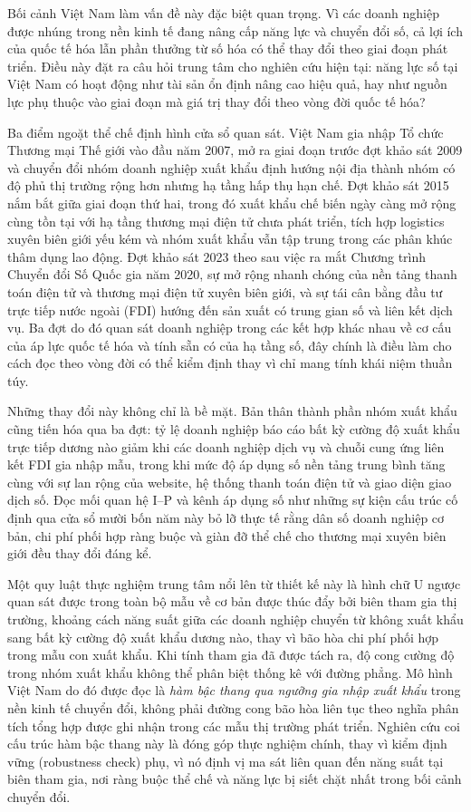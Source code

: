 \documentclass[12pt,a4paper]{article}
\begin{document}
Bối cảnh Việt Nam làm vấn đề này đặc biệt quan trọng. Vì các doanh
nghiệp được nhúng trong nền kinh tế đang nâng cấp năng lực và chuyển đổi
số, cả lợi ích của quốc tế hóa lẫn phần thưởng từ số hóa có thể thay đổi
theo giai đoạn phát triển. Điều này đặt ra câu hỏi trung tâm cho nghiên
cứu hiện tại: năng lực số tại Việt Nam có hoạt động như tài sản ổn định
nâng cao hiệu quả, hay như nguồn lực phụ thuộc vào giai đoạn mà giá trị
thay đổi theo vòng đời quốc tế hóa?

Ba điểm ngoặt thể chế định hình cửa sổ quan sát. Việt Nam gia nhập Tổ
chức Thương mại Thế giới vào đầu năm 2007, mở ra giai đoạn trước đợt
khảo sát 2009 và chuyển đổi nhóm doanh nghiệp xuất khẩu định hướng nội
địa thành nhóm có độ phủ thị trường rộng hơn nhưng hạ tầng hấp thụ hạn
chế. Đợt khảo sát 2015 nắm bắt giữa giai đoạn thứ hai, trong đó xuất
khẩu chế biến ngày càng mở rộng cùng tồn tại với hạ tầng thương mại điện
tử chưa phát triển, tích hợp logistics xuyên biên giới yếu kém và nhóm
xuất khẩu vẫn tập trung trong các phân khúc thâm dụng lao động. Đợt khảo
sát 2023 theo sau việc ra mắt Chương trình Chuyển đổi Số Quốc gia năm
2020, sự mở rộng nhanh chóng của nền tảng thanh toán điện tử và thương
mại điện tử xuyên biên giới, và sự tái cân bằng đầu tư trực tiếp nước
ngoài (FDI) hướng đến sản xuất có trung gian số và liên kết dịch vụ. Ba
đợt do đó quan sát doanh nghiệp trong các kết hợp khác nhau về cơ cấu
của áp lực quốc tế hóa và tính sẵn có của hạ tầng số, đây chính là điều
làm cho cách đọc theo vòng đời có thể kiểm định thay vì chỉ mang tính
khái niệm thuần túy.

Những thay đổi này không chỉ là bề mặt. Bản thân thành phần nhóm xuất
khẩu cũng tiến hóa qua ba đợt: tỷ lệ doanh nghiệp báo cáo bất kỳ cường
độ xuất khẩu trực tiếp dương nào giảm khi các doanh nghiệp dịch vụ và
chuỗi cung ứng liên kết FDI gia nhập mẫu, trong khi mức độ áp dụng số
nền tảng trung bình tăng cùng với sự lan rộng của website, hệ thống
thanh toán điện tử và giao diện giao dịch số. Đọc mối quan hệ I--P và
kênh áp dụng số như những sự kiện cấu trúc cố định qua cửa sổ mười bốn
năm này bỏ lỡ thực tế rằng dân số doanh nghiệp cơ bản, chi phí phối hợp
ràng buộc và giàn đỡ thể chế cho thương mại xuyên biên giới đều thay đổi
đáng kể.

Một quy luật thực nghiệm trung tâm nổi lên từ thiết kế này là hình chữ U
ngược quan sát được trong toàn bộ mẫu về cơ bản được thúc đẩy bởi biên
tham gia thị trường, khoảng cách năng suất giữa các doanh nghiệp chuyển
từ không xuất khẩu sang bất kỳ cường độ xuất khẩu dương nào, thay vì bão
hòa chi phí phối hợp trong mẫu con xuất khẩu. Khi tính tham gia đã được
tách ra, độ cong cường độ trong nhóm xuất khẩu không thể phân biệt thống
kê với đường phẳng. Mô hình Việt Nam do đó được đọc là \emph{hàm bậc
thang qua ngưỡng gia nhập xuất khẩu} trong nền kinh tế chuyển đổi, không
phải đường cong bão hòa liên tục theo nghĩa phân tích tổng hợp được ghi
nhận trong các mẫu thị trường phát triển. Nghiên cứu coi cấu trúc hàm
bậc thang này là đóng góp thực nghiệm chính, thay vì kiểm định vững
(robustness check) phụ, vì nó định vị ma sát liên quan đến năng suất tại
biên tham gia, nơi ràng buộc thể chế và năng lực bị siết chặt nhất trong
bối cảnh chuyển đổi.
\end{document}
